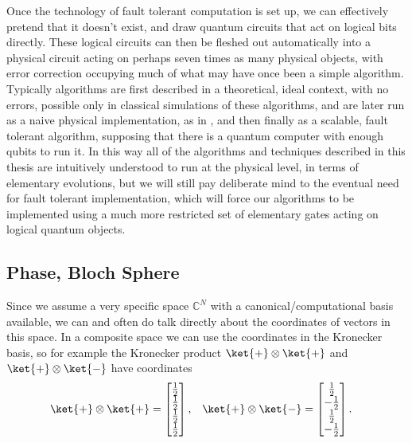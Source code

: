Once the technology of fault tolerant computation is set up, we can effectively pretend that it doesn't exist, and draw quantum circuits that act on logical bits directly. These logical circuits can then be fleshed out automatically into a physical circuit acting on perhaps seven times as many physical objects, with error correction occupying much of what may have once been a simple algorithm. Typically algorithms are first described in a theoretical, ideal context, with no errors, possible only in classical simulations of these algorithms, and are later run as a naive physical implementation, as in \cite{algos}, and then finally as a scalable, fault tolerant algorithm, supposing that there is a quantum computer with enough qubits to run it. In this way all of the algorithms and techniques described in this thesis are intuitively understood to run at the physical level, in terms of elementary evolutions, but we will still pay deliberate mind to the eventual need for fault tolerant implementation, which will force our algorithms to be implemented using a much more restricted set of elementary gates acting on logical quantum objects.

\subsection{Phase, Bloch Sphere}
Since we assume a very specific space $\mathbb{C}^N$ with a canonical/computational basis available, we can and often do talk directly about the coordinates of vectors in this space. In a composite space we can use the coordinates in the Kronecker basis, so for example the Kronecker product $\ket{+}\otimes \ket{+}$ and $\ket{+} \otimes \ket{-}$ have coordinates
\begin{align*}
\ket{+} \otimes \ket{+} = \left[\begin{matrix}
\frac{1}{2} \\
\frac{1}{2} \\
\frac{1}{2} \\
\frac{1}{2} \\
\end{matrix}\right],
&&&
\ket{+} \otimes \ket{-} = \left[\begin{matrix}
	\frac{1}{2} \\
	-\frac{1}{2} \\
	\frac{1}{2} \\
	-\frac{1}{2} \\
\end{matrix}\right].\end{align*}

